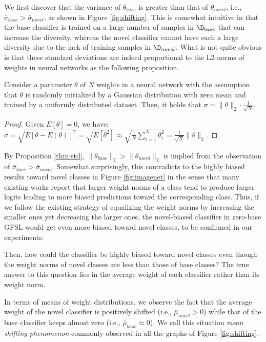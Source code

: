 We first discover that the variance of $\theta_{base}$ is greater than that of $\theta_{novel}$, i.e., $\bar \sigma_{base} > \bar \sigma_{novel}$, as shown in Figure \ref{fig:shifting}. This is somewhat intuitive in that the base classifier is trained on a large number of samples in $\D_{base}$ that can increase the diversity, whereas the novel classifier cannot have such a large diversity due to the lack of training samples in $\D_{novel}$. What is not quite obvious is that these standard deviations are indeed proportional to the L2-norms of weights in neural networks as the following proposition.
\begin{proposition} \label{thm:std}
Consider a parameter $\theta$ of $N$ weights in a neural network with the assumption that $\theta$ is randomly initialized by a Gaussian distribution with zero mean and trained by a uniformly distributed dataset. Then, it holds that $\sigma  = {\rVert \theta \rVert_2 \cdot \frac{1}{\sqrt{N}}}$.
\end{proposition}
\begin{proof}
Given $E[\theta] = 0$, we have: $\sigma = \sqrt{E[\theta-E(\theta)]^2} = \sqrt{E[\theta^2]} \approx \sqrt{\frac{1}{N}\sum_{i=1}^{N}\theta_i^2} = {\frac{1}{\sqrt{N}} \rVert \theta \rVert _2}.$
\end{proof}
By Proposition \ref{thm:std}, $\rVert\theta_{base}\rVert_2 > \rVert\theta_{novel}\rVert_2$ is implied from the observation of $\bar \sigma_{base} > \bar \sigma_{novel}$. Somewhat surprisingly, this contradicts to the highly biased results toward novel classes in Figure \ref{fig:imagenet} in the sense that many existing works \cite{HouPLWL19,KangXRYGFK20,ZhaoXGZX20} report that larger weight norms of a class tend to produce larger logits leading to more biased predictions toward the corresponding class. Thus, if we follow the existing strategy of equalizing the weight norms \cite{HouPLWL19,KangXRYGFK20,ZhaoXGZX20} by increasing the smaller ones yet decreasing the larger ones, the novel-biased classifier in zero-base GFSL would get even more biased toward novel classes, to be confirmed in our experiments.

Then, how could the classifier be highly biased toward novel classes even though the weight norms of novel classes are less than those of base classes? The true answer to this question lies in the average weight of each classifier rather than its weight norm.

In terms of means of weight distributions, we observe the fact that the average weight of the novel classifier is positively shifted (i.e., $\bar \mu_{novel} > 0$) while that of the base classifier keeps almost zero (i.e., $\bar \mu_{base} \approx 0$). We call this situation \textit{mean shifting phenomenon} commonly observed in all the graphs of Figure \ref{fig:shifting}. 

